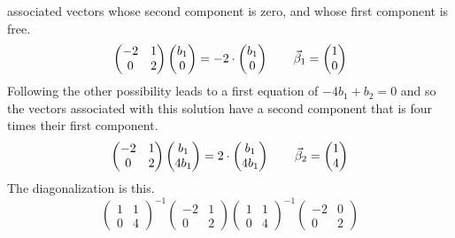 \begin{exercises}
\begin{answer}
\begin{exparts}
          associated vectors whose second component is zero, and whose
          first component is free.  
          \begin{equation*}
            \begin{pmatrix}
              -2  &1  \\
               0  &2
            \end{pmatrix}
            \begin{pmatrix} b_1 \\ 0 \end{pmatrix}
            =-2\cdot\begin{pmatrix} b_1 \\ 0 \end{pmatrix}
            \qquad
            \vec{\beta}_1=\begin{pmatrix} 1 \\ 0 \end{pmatrix}
          \end{equation*}
          Following the other possibility leads to a first equation of
          $-4b_1+b_2=0$ and so the vectors associated with this 
          solution have a second component that is four times their first
          component.
          \begin{equation*}
            \begin{pmatrix}
              -2  &1  \\
               0  &2
            \end{pmatrix}
            \begin{pmatrix} b_1 \\ 4b_1 \end{pmatrix}
            =2\cdot\begin{pmatrix} b_1 \\ 4b_1 \end{pmatrix}
            \qquad
            \vec{\beta}_2=\begin{pmatrix} 1 \\ 4 \end{pmatrix}
          \end{equation*}
          The diagonalization is this.
          \begin{equation*}
            \begin{pmatrix}
              1  &1  \\
              0  &4
            \end{pmatrix}^{-1}
            \begin{pmatrix}
              -2  &1  \\
               0  &2
            \end{pmatrix}
            \begin{pmatrix}
              1  &1  \\
              0  &4
            \end{pmatrix}^{-1}
            \begin{pmatrix}
              -2  &0  \\
               0  &2
            \end{pmatrix}
          \end{equation*}

\end{exparts}
\end{answer}
\end{exercises}
